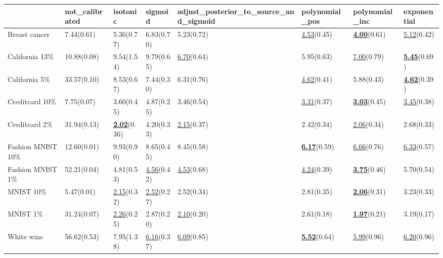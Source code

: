 \begin{tabular}{llllllll}
\toprule
 & not_calibrated & isotonic & sigmoid & adjust_posterior_to_source_and_sigmoid & polynomial_pos & polynomial_inc & exponential \\
\midrule
Breast cancer & 7.44(0.61) & 5.36(0.77) & 6.83(0.70) & 5.23(0.72) & \underline{4.53}(0.45) & \underline{\textbf{4.00}}(0.61) & \underline{5.12}(0.42) \\
California 13\% & 10.88(0.08) & 9.54(1.54) & 9.79(0.65) & \underline{6.70}(0.64) & 5.95(0.63) & \underline{7.00}(0.79) & \underline{\textbf{5.45}}(0.69) \\
California 5\% & 33.57(0.10) & 8.53(0.67) & 7.44(0.30) & 6.31(0.76) & \underline{4.62}(0.41) & 5.88(0.43) & \underline{\textbf{4.62}}(0.39) \\
Creditcard 10\% & 7.75(0.07) & 3.60(0.45) & 4.87(0.25) & 3.46(0.54) & \underline{3.31}(0.37) & \underline{\textbf{3.03}}(0.45) & \underline{3.45}(0.38) \\
Creditcard 2\% & 31.94(0.13) & \underline{\textbf{2.02}}(0.36) & 4.20(0.33) & \underline{2.15}(0.37) & 2.42(0.34) & \underline{2.06}(0.34) & 2.68(0.33) \\
Fashion MNIST 10\% & 12.60(0.01) & 9.93(0.90) & 8.65(0.45) & 8.45(0.58) & \underline{\textbf{6.17}}(0.59) & \underline{6.66}(0.76) & \underline{6.33}(0.57) \\
Fashion MNIST 1\% & 52.21(0.04) & 4.81(0.53) & \underline{4.56}(0.42) & \underline{4.53}(0.68) & \underline{4.24}(0.39) & \underline{\textbf{3.75}}(0.46) & 5.70(0.54) \\
MNIST 10\% & 5.47(0.01) & \underline{2.15}(0.32) & \underline{2.52}(0.27) & 2.52(0.34) & 2.81(0.35) & \underline{\textbf{2.06}}(0.31) & 3.23(0.33) \\
MNIST 1\% & 31.24(0.07) & \underline{2.26}(0.25) & 2.87(0.20) & \underline{2.10}(0.20) & 2.61(0.18) & \underline{\textbf{1.97}}(0.21) & 3.19(0.17) \\
White wine & 56.62(0.53) & 7.95(1.38) & \underline{6.16}(0.37) & \underline{6.09}(0.85) & \underline{\textbf{5.52}}(0.64) & \underline{5.99}(0.96) & \underline{6.20}(0.96) \\
\bottomrule
\end{tabular}
